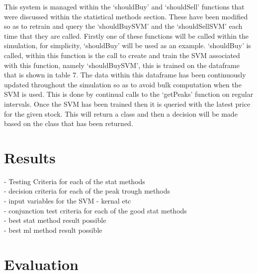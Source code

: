 \documentclass[12pt,a4paper]{article}
\begin{document}
This system is managed within the `shouldBuy' and `shouldSell' functions that were discussed within the statistical methods section. These have been modified so as to retrain and query the `shouldBuySVM' and the `shouldSellSVM' each time that they are called. Firstly one of these functions will be called within the simulation, for simplicity, `shouldBuy' will be used as an example. `shouldBuy' is called, within this function is the call to create and train the SVM associated with this function, namely `shouldBuySVM', this is trained on the dataframe that is shown in table 7. The data within this dataframe has been continuously updated throughout the simulation so as to avoid bulk computation when the SVM is used. This is done by continual calls to the `getPeaks' function on regular intervals. Once the SVM has been trained then it is queried with the latest price for the given stock. This will return a class and then a decision will be made based on the class that has been returned.

\iffalse
#################################################################################
\fi

\section{Results}

\iffalse
this section presents the results of the solutions.  It should include information on experimental settings.  The results should demonstrate the claimed benefits/disadvantages of the proposed solutions.
This section should be between 2 to 3 pages in length.
\fi

- Testing Criteria for each of the stat methods\\
- decision criteria for each of the peak trough methods\\
- input variables for the SVM - kernal etc \\
- conjunction test criteria for each of the good stat methods\\
- best stat method result possible\\
- best ml method result possible

\iffalse
#################################################################################
\fi

\section{Evaluation}

\iffalse
This section should between 1 to 2 pages in length.
\fi
\end{document}
